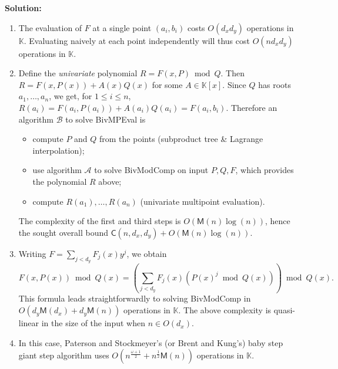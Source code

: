 \documentclass[11pt,a4paper,reqno]{amsart}
\newif\ifShowSolutions
\newcommand{\field}{\mathbb{K}} %
\newcommand{\pring}{\field[x]} %
\newcommand{\bigO}[1]{O(#1)} %
\newcommand{\timepm}[1]{\mathsf{M}(#1)} %
\begin{document}
\ifShowSolutions
%
\textbf{Solution:}
\begin{enumerate}
  \item

    The evaluation of \(F\) at a single point \((a_i,b_i)\) costs \(\bigO{d_x
    d_y}\) operations in \(\field\). Evaluating naively at each point
    independently will thus cost \(\bigO{n d_x d_y}\) operations in \(\field\).

  \item 

    Define the \emph{univariate} polynomial \(R = F(x,P) \bmod Q\). Then \(R =
    F(x,P(x)) + A(x) Q(x)\) for some \(A \in\pring\). Since \(Q\) has roots
    \(a_1,\ldots,a_n\), we get, for \(1 \le i \le n\), \(R(a_i) = F(a_i,P(a_i))
    + A(a_i) Q(a_i) = F(a_i,b_i)\). Therefore an algorithm \(\mathcal{B}\) to
    solve \textsf{BivMPEval} is
    \begin{itemize}
      \item compute \(P\) and \(Q\) from the points (subproduct tree \& Lagrange interpolation);
      \item use algorithm \(\mathcal{A}\) to solve \textsf{BivModComp} on input
        \(P,Q,F\), which provides the polynomial \(R\) above;
      \item compute \(R(a_1),\ldots,R(a_n)\) (univariate multipoint evaluation).
    \end{itemize}
    The complexity of the first and third steps is
    \(\bigO{\timepm{n}\log(n)}\), hence the sought overall bound
    \(\mathsf{C}(n,d_x,d_y) + \bigO{\timepm{n}\log(n)}\).

  \item Writing \(F = \sum_{j < d_y} F_j(x) y^j\), we obtain
    \[
      F(x,P(x)) \bmod Q(x) = \left(\sum_{j<d_y} F_j(x) \left(P(x)^j \bmod Q(x)\right)\right)  \bmod Q(x).
    \]
    This formula leads straightforwardly to solving \textsf{BivModComp} in
    \(\bigO{d_y \timepm{d_x} + d_y\timepm{n}}\) operations in \(\field\).  The
    above complexity is quasi-linear in the size of the input when \(n \in
    \bigO{d_x}\). 

  \item In this case, Paterson and Stockmeyer's (or Brent and Kung's) baby step
    giant step algorithm uses \(\bigO{n^{\frac{\omega+1}{2}} + n^{\frac12}
    \timepm{n}}\) operations in \(\field\).


\end{enumerate}
\end{document}
